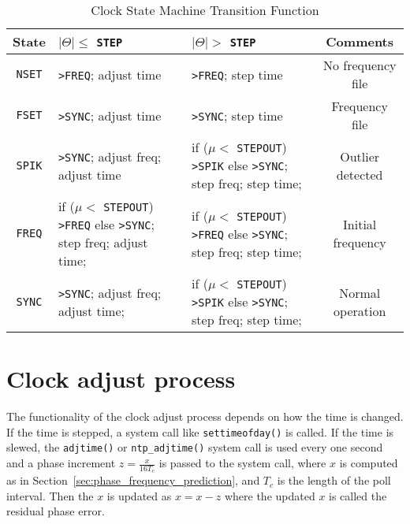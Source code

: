 \begin{table}[ht]
    \centering
    \caption{Clock State Machine Transition Function}
    \label{tab:clock_state_machine_transition_function}
    \begin{tabular}{|c|p{43mm}|p{43mm}|c|}
        \hline
        State &\hfil $|\Theta|\le$ \verb|STEP| & \hfil $|\Theta|>$ \verb|STEP| 
        & Comments \\
        \hline
        \verb|NSET| & \verb|>FREQ|; adjust time & \verb|>FREQ|; step time 
            & No frequency file \\
        \hline
        \verb|FSET| & \verb|>SYNC|; adjust time & \verb|>SYNC|; step time
            & Frequency file \\
        \hline
        \verb|SPIK| & \verb|>SYNC|; adjust freq; adjust time 
        & if ($\mu <$ \verb|STEPOUT|) \verb|>SPIK| \newline 
        else \verb|>SYNC|; step freq; step time;
        & Outlier detected \\
        \hline
        \verb|FREQ| & if ($\mu <$ \verb|STEPOUT|) \verb|>FREQ| \newline 
        else \verb|>SYNC|; step freq; adjust time;
        & if ($\mu <$ \verb|STEPOUT|) \verb|>FREQ| \newline 
        else \verb|>SYNC|; step freq; step time;
        & Initial frequency \\
        \hline
        \verb|SYNC| & \verb|>SYNC|; adjust freq; adjust time;
        & if ($\mu <$ \verb|STEPOUT|) \verb|>SPIK| \newline 
        else \verb|>SYNC|; step freq; step time; & Normal operation \\
        \hline
    \end{tabular}
\end{table}

\section{Clock adjust process}%
\label{sec:clock_adjust_process}
The functionality of the clock adjust process depends on how the time is
changed.  If the time is stepped, a system call like \verb|settimeofday()| is
called. If the time is slewed, the \verb|adjtime()| or \verb|ntp_adjtime()|
system call is used every one second and a phase increment $z=\frac{x}{16T_c}$
is passed to the system call, where $x$ is computed as in
Section~\ref{sec:phase_frequency_prediction}, and $T_c$ is the length of the
poll interval.  Then the $x$ is updated as $x=x-z$ where the updated $x$ is
called the residual phase error.

